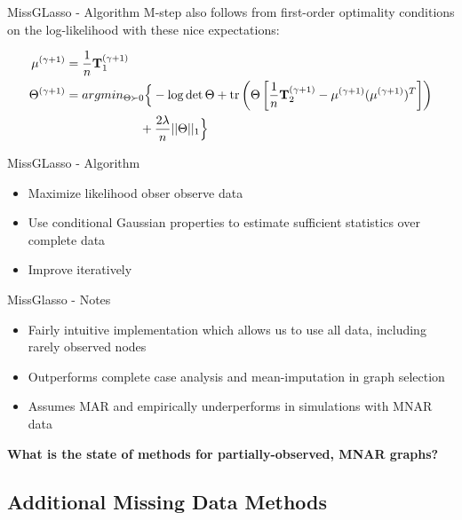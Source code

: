 \documentclass{beamer}
\begin{document}
\begin{frame}{MissGLasso - Algorithm}
M-step also follows from first-order optimality conditions on the log-likelihood with these nice expectations:

\begin{align*}
    \mu^{(\gamma+1)}
    &=
    \frac{1}{n}\mathbf{T}_1^{(\gamma+1)}
    \\
    \Theta^{(\gamma + 1)}
    &=
    argmin_{\Theta \succ 0}
    \Big\{
    -\log \det \Theta 
    +
    \text{tr}
    \left(
        \Theta 
        \left[ 
            \frac{1}{n}\mathbf{T}_2^{(\gamma + 1)}
            -
            \mu^{(\gamma + 1)}
            (\mu^{(\gamma + 1)})^T
        \right]
    \right)
    \\
    &\hspace{21mm}
    +
    \frac{2\lambda}{n}||\Theta||_1 \Big\}
\end{align*}

\end{frame}

\begin{frame}{MissGLasso - Algorithm}
    \bf{
\begin{itemize}
    \item Maximize likelihood obser observe data 
    \item Use conditional Gaussian properties to estimate sufficient statistics over complete data 
    \item Improve iteratively 
\end{itemize}
    }
\end{frame}

\begin{frame}{MissGlasso - Notes}
    \begin{itemize}
        \item Fairly intuitive implementation which allows us to use all data, including rarely observed nodes 
        \item Outperforms complete case analysis and mean-imputation in graph selection 
        \item Assumes MAR and empirically underperforms in simulations with MNAR data 
    \end{itemize}
\end{frame}

\begin{frame}{}
    \bf{\Large What is the state of methods for partially-observed, MNAR graphs?}
\end{frame}

\subsection{Additional Missing Data Methods}
\end{document}
